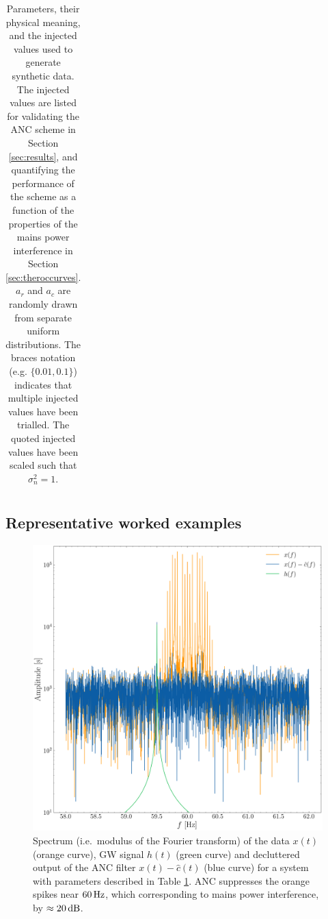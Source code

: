 \documentclass[pra,superscriptaddress,reprint,amsmath,amssymb,nofootinbib]{revtex4-2}
\begin{document}
\begin{table}
\begin{tabular}{llcc}
	\end{tabular} 
	
	\caption{Parameters, their physical meaning, and the injected values used to generate synthetic data. The injected values are listed for validating the ANC scheme in Section \ref{sec:results}, and quantifying the performance of the scheme as a function of the properties of the mains power interference in Section  \ref{sec:theroccurves}. $a_r$ and $a_c$ are randomly drawn from separate uniform distributions. The braces notation (e.g. $\{0.01, 0.1\}$) indicates that multiple injected values have been trialled. The quoted injected values have been scaled such that $\sigma_n^2 = 1$.}
	\label{tab:parameterdescription1}
\end{table}



\subsection{Representative worked examples} \label{sec:representative_example}
\begin{figure}
	\begin{center}
		\includegraphics[width=\columnwidth]{images/spectrum.png}
	\end{center}
	\caption{Spectrum (i.e.\ modulus of the Fourier transform) of the data $x(t)$ (orange curve), GW signal $h(t)$ (green curve) and decluttered output of the ANC filter $x(t) - \hat{c}(t)$ (blue curve) for a system with parameters described in Table \ref{tab:parameterdescription1}. ANC suppresses the orange spikes near $60 \, {\rm Hz}$, which corresponding to mains power interference, by $\approx 20\, {\rm dB}$.}
	\label{fig:spectrum}
\end{figure}
\end{document}
